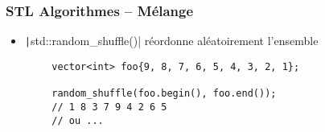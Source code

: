 \documentclass[C++.tex]{subfiles}
\begin{document}
\begin{frame}[fragile]
	\frametitle{STL Algorithmes -- Mélange}
	\begin{itemize}
		\item \texttt|std::random_shuffle()| réordonne aléatoirement l'ensemble
	\end{itemize}

	\begin{verbatim}
		vector<int> foo{9, 8, 7, 6, 5, 4, 3, 2, 1};

		random_shuffle(foo.begin(), foo.end());
		// 1 8 3 7 9 4 2 6 5
		// ou ...
	\end{verbatim}

\end{frame}
\end{document}
